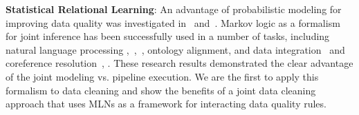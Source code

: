 \textbf{Statistical Relational Learning}: An advantage of probabilistic modeling for improving data quality was investigated in~\cite{doi:10.1080/01621459.1972.10481323} and~\cite{chen2011usher}. Markov logic as a formalism for joint inference has been successfully used in a number of tasks, including natural language processing \cite{che2010jointly},~\cite{riedel08collective},~\cite{meza09jointly}, ontology alignment, and data integration~\cite{niepert2011probabilistic} and coreference resolution~\cite{poon2008joint}, \cite{singla2006entity}. These research results demonstrated the clear advantage of the joint modeling vs. pipeline execution. We are the first to apply this formalism to data cleaning and show the benefits of a joint data cleaning approach that uses MLNs as a framework for interacting data quality rules. 

